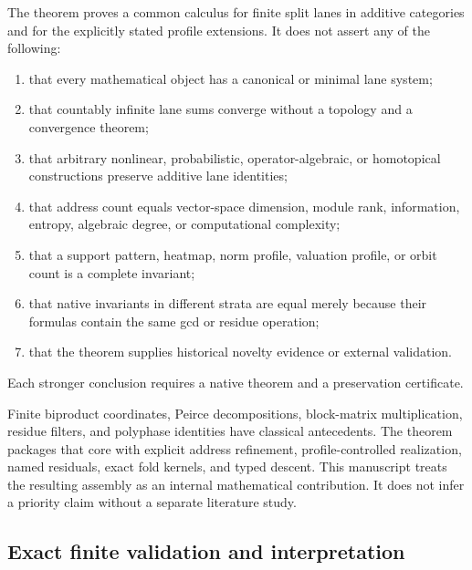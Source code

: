 \begin{boundary}
\label{bnd:block15-universal-boundary}
The theorem proves a common calculus for finite split lanes in additive
categories and for the explicitly stated profile extensions.  It does not
assert any of the following:
\begin{enumerate}
\item that every mathematical object has a canonical or minimal lane system;
\item that countably infinite lane sums converge without a topology and a
convergence theorem;
\item that arbitrary nonlinear, probabilistic, operator-algebraic, or
homotopical constructions preserve additive lane identities;
\item that address count equals vector-space dimension, module rank,
information, entropy, algebraic degree, or computational complexity;
\item that a support pattern, heatmap, norm profile, valuation profile, or
orbit count is a complete invariant;
\item that native invariants in different strata are equal merely because
their formulas contain the same gcd or residue operation;
\item that the theorem supplies historical novelty evidence or external
validation.
\end{enumerate}
Each stronger conclusion requires a native theorem and a preservation
certificate.
\end{boundary}

\begin{remark}
\label{rem:block15-classical-core}
Finite biproduct coordinates, Peirce decompositions, block-matrix
multiplication, residue filters, and polyphase identities have classical
antecedents.  The theorem packages that core with explicit address refinement,
profile-controlled realization, named residuals, exact fold kernels, and
typed descent.  This manuscript treats the resulting assembly as an internal
mathematical contribution.  It does not infer a priority claim without a
separate literature study.
\end{remark}

\subsection{Exact finite validation and interpretation}
\label{subsec:block15-validation}

